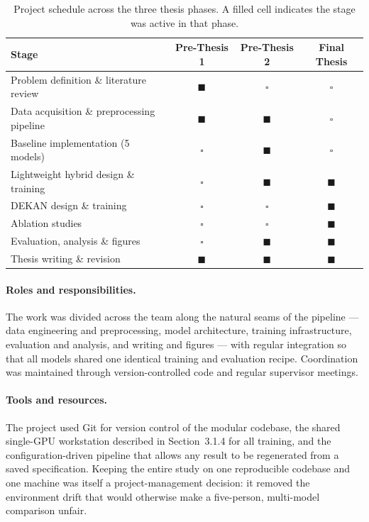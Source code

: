 \begin{table}[h]
\centering
\caption{Project schedule across the three thesis phases. A filled cell
indicates the stage was active in that phase.}
\label{tab:project-schedule}
\begin{tabular}{p{}ccc}
\toprule
Stage & Pre-Thesis 1 & Pre-Thesis 2 & Final Thesis \\
\midrule
Problem definition \& literature review        & $\blacksquare$ & $\square$ & $\square$ \\
Data acquisition \& preprocessing pipeline      & $\blacksquare$ & $\blacksquare$ & $\square$ \\
Baseline implementation (5 models)              & $\square$ & $\blacksquare$ & $\square$ \\
Lightweight hybrid design \& training           & $\square$ & $\blacksquare$ & $\blacksquare$ \\
DEKAN design \& training                        & $\square$ & $\square$ & $\blacksquare$ \\
Ablation studies                                & $\square$ & $\square$ & $\blacksquare$ \\
Evaluation, analysis \& figures                 & $\square$ & $\blacksquare$ & $\blacksquare$ \\
Thesis writing \& revision                      & $\blacksquare$ & $\blacksquare$ & $\blacksquare$ \\
\bottomrule
\end{tabular}
\end{table}

\paragraph{Roles and responsibilities.}
The work was divided across the team along the natural seams of the pipeline
--- data engineering and preprocessing, model architecture, training
infrastructure, evaluation and analysis, and writing and figures --- with
regular integration so that all models shared one identical training and
evaluation recipe. %
Coordination was maintained through version-controlled code and regular
supervisor meetings.

\paragraph{Tools and resources.}
The project used Git for version control of the modular codebase, the shared
single-GPU workstation described in Section~3.1.4 for all training, and the
configuration-driven pipeline that allows any result to be regenerated from a
saved specification. Keeping the entire study on one reproducible codebase and
one machine was itself a project-management decision: it removed the
environment drift that would otherwise make a five-person, multi-model
comparison unfair.


